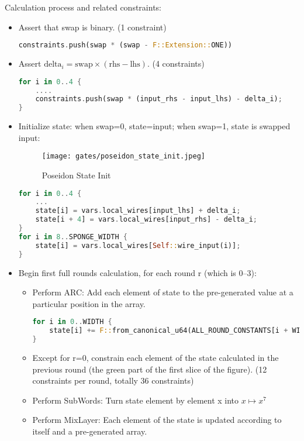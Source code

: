 Calculation process and related constraints:
\begin{itemize}
    \item Assert that swap is binary. (1 constraint)
    \begin{lstlisting}[language=rust]
constraints.push(swap * (swap - F::Extension::ONE))
    \end{lstlisting}
    \item Assert $\text{delta}_i = \text{swap} \times (\text{rhs} - \text{lhs})$. (4 constraints)
    \begin{lstlisting}[language=rust]
for i in 0..4 {
    ....
    constraints.push(swap * (input_rhs - input_lhs) - delta_i);
}
    \end{lstlisting}
    \item Initialize state: when swap=0, state=input; when swap=1, state is swapped input:
    \begin{figure}[!ht]
        \centering
        \texttt{[image: gates/poseidon\_state\_init.jpeg]}
        \caption{Poseidon State Init}
        \label{fig:poseidon-state-init}
    \end{figure}
    \begin{lstlisting}[language=rust]
for i in 0..4 {
    ...
    state[i] = vars.local_wires[input_lhs] + delta_i;
    state[i + 4] = vars.local_wires[input_rhs] - delta_i;
}
for i in 8..SPONGE_WIDTH {
    state[i] = vars.local_wires[Self::wire_input(i)];
}
    \end{lstlisting}
    \item Begin first full rounds calculation, for each round r (which is 0--3):
    \begin{itemize}
        \item Perform ARC: Add each element of state to the pre-generated value at a particular position in the array.
        \begin{lstlisting}[language=rust]
for i in 0..WIDTH {
    state[i] += F::from_canonical_u64(ALL_ROUND_CONSTANTS[i + WIDTH * round_ctr]);
}
        \end{lstlisting}
        \item Except for r=0, constrain each element of the state calculated in the previous round (the green part of the first slice of the figure). 
        (12 constraints per round, totally 36 constraints)
        \item Perform SubWords: Turn state element by element x into $x \mapsto x^7$
        \item Perform MixLayer: Each element of the state is updated according to itself and a pre-generated array.

\end{itemize}
\end{itemize}
